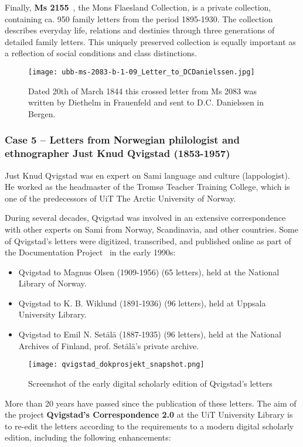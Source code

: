 \documentclass[runningheads]{llncs}
\begin{document}
Finally, \textbf{Ms 2155}~\cite{ref_url8}, the Mons Flaesland
Collection, is a private collection, containing ca. 950 family letters
from the period 1895-1930. The collection describes everyday life,
relations and destinies through three generations of detailed family
letters. This uniquely preserved collection is equally important as a
reflection of social conditions and class distinctions.

\begin{figure}
\texttt{[image: ubb-ms-2083-b-1-09\_Letter\_to\_DCDanielssen.jpg]}
\caption{Dated 20th of March 1844 this crossed letter from Ms 2083 was written by Diethelm in Frauenfeld and sent to D.C. Danielssen in Bergen.} \label{fig7}
\end{figure}

\subsubsection{Case 5 -- Letters from Norwegian philologist and ethnographer Just Knud Qvigstad (1853-1957)}
Just Knud Qvigstad was en expert on Sami language and culture
(lappologist). He worked as the headmaster of the Tromsø Teacher
Training College, which is one of the predecessors of UiT The Arctic
University of Norway.

During several decades, Qvigstad was involved in an extensive
correspondence with other experts on Sami from Norway, Scandinavia, and
other countries. Some of Qvigstad's letters were digitized, transcribed,
and published online as part of the Documentation
Project~\cite{ref_dokpro} in the early 1990s:
\begin{itemize}
\tightlist
\item
  Qvigstad to Magnus Olsen (1909-1956) (65 letters), held at the
  National Library of Norway.
\item
  Qvigstad to K. B. Wiklund (1891-1936) (96 letters), held at Uppsala
  University Library.
\item
  Qvigstad to Emil N. Setälä (1887-1935) (96 letters), held at the
  National Archives of Finland, prof. Setälä's private archive.
\end{itemize}

\begin{figure}
\texttt{[image: qvigstad\_dokprosjekt\_snapshot.png]}
\caption{Screenshot of the early digital scholarly edition of Qvigstad's letters} \label{fig8}
\end{figure}
More than 20 years have passed since the publication of these letters.
The aim of the project \textbf{Qvigstad's Correspondence 2.0} at the UiT
University Library is to re-edit the letters according to the
requirements to a modern digital scholarly edition, including the
following enhancements:
\end{document}
